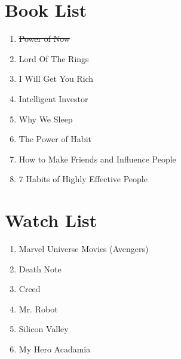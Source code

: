 \documentclass[10pt]{article}
\begin{document}
\section*{Book List}
\begin{enumerate}
    \item \sout{Power of Now}
    \item Lord Of The Rings
    \item I Will Get You Rich
    \item Intelligent Investor
    \item Why We Sleep
    \item The Power of Habit
    \item How to Make Friends and Influence People
    \item 7 Habits of Highly Effective People
\end{enumerate}

\section*{Watch List}
\begin{enumerate}
    \item Marvel Universe Movies (Avengers)
    \item Death Note
    \item Creed
    \item Mr. Robot
    \item Silicon Valley
    \item My Hero Acadamia
\end{enumerate}
\end{document}
